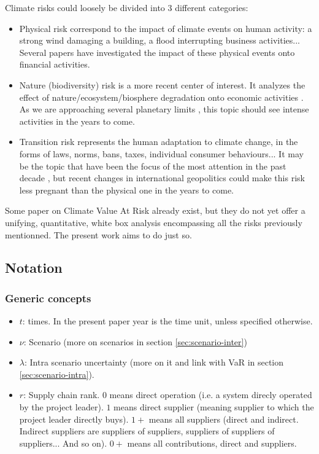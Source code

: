 Climate risks could loosely be divided into 3 different categories:
\begin{itemize}
\item[•] Physical risk \cite{IPCCRisk} correspond to the impact of climate events on human activity: a strong wind damaging a building, a flood interrupting business activities...  Several papers \cite{LeGuenedal}\cite{BID}\cite{Bernhofen}\cite{Azzone} have investigated the impact of these physical events onto financial activities.
\item[•] Nature (biodiversity) risk is a more recent center of interest. It analyzes the effect of nature/ecosystem/biosphere degradation onto economic activities \cite{RoncalliNatureCap}\cite{SPGNatureBio}\cite{NatureF4}. As we are approaching several planetary limits \cite{PlanetaryBoundaries}\cite{PlanetaryBoundariesUpdate}, this topic should see intense activities in the years to come.
\item[•] Transition risk represents the human adaptation to climate change, in the forms of laws, norms, bans, taxes, individual consumer behaviours... It may be the topic that have been the focus of the most attention in the past decade \cite{RoncalliCC}\cite{TransitionRiskCaldecott}\cite{FDIC}\cite{TCFD}, but recent changes in international geopolitics \cite{OmnibusRollback} could make this risk less pregnant than the physical one in the years to come.
\end{itemize}

Some paper on Climate Value At Risk \cite{RoncalliVaR}\cite{MSCIClimateVaR} already exist, but they do not yet offer a unifying, quantitative, white box analysis encompassing all the risks previously mentionned. The present work aims to do just so.

\subsection{Notation} \label{sec:notation}

\subsubsection{Generic concepts}

\begin{itemize}
\item[•] $t$: times. In the present paper year is the time unit, unless specified otherwise.
\item[•] $\nu$: Scenario (more on scenarios in section \ref{sec:scenario-inter})
\item[•] $\lambda$: Intra scenario uncertainty (more on it and link with VaR in section \ref{sec:scenario-intra}).
\item[•] $r$: Supply chain rank. $0$ means direct operation (i.e. a system direcly operated by the project leader). $1$ means direct supplier (meaning supplier to which the project leader directly buys). $1+$ means all suppliers (direct and indirect. Indirect suppliers are suppliers of suppliers, suppliers of suppliers of suppliers... And so on). $0+$ means all contributions, direct and suppliers.
\end{itemize}

